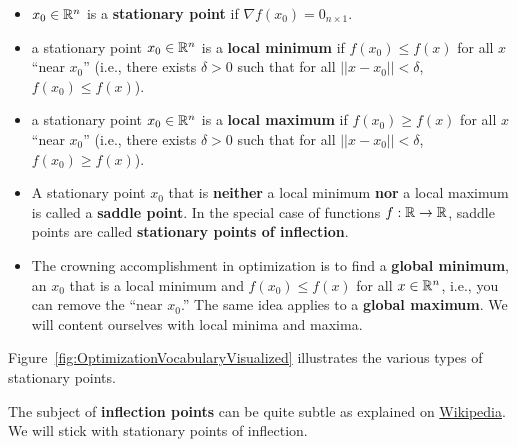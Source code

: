 \begin{enumerate}
{\begin{itemize}
    \item  $x_0 \in \mathbb R^n$ is a \textbf{stationary point} if $\nabla f(x_0)={0}_{n \times 1}$.
    \item  a stationary point $x_0 \in \mathbb R^n$ is a \textbf{local minimum} if $f(x_0) \le f(x)$ for all $x$ ``near $x_0$'' (i.e., there exists $\delta >0$ such that for all $||x - x_0|| < \delta$, $f(x_0) \le f(x)$).
    \item  a stationary point $x_0 \in \mathbb R^n$ is a \textbf{local maximum} if $f(x_0) \ge f(x)$ for all $x$ ``near $x_0$'' (i.e., there exists $\delta >0$ such that for all $||x - x_0|| < \delta$, $f(x_0) \ge f(x)$).
        \item A stationary point $x_0$ that is \textbf{neither} a local minimum \textbf{nor} a local maximum is called a \textbf{saddle point}. In the special case of functions $f:\mathbb R \to \mathbb R$, saddle points are called \textbf{stationary points of inflection}. 
    \item The crowning accomplishment in optimization is to find a \textbf{global minimum}, an $x_0$ that is a local minimum and $f(x_0) \le f(x)$ for all $x\in \mathbb R^n$, i.e., you can remove the ``near $x_0$.'' The same idea applies to a \textbf{global maximum}. We will content ourselves with local minima and maxima. 
\end{itemize}

\bigskip

Figure~\ref{fig:OptimizationVocabularyVisualized} illustrates the various types of stationary points.} The subject of \textbf{inflection points} can be quite subtle as explained on \href{https://tinyurl.com/yx9bz7ep}{Wikipedia}. We will stick with stationary points of inflection.


\end{enumerate}

